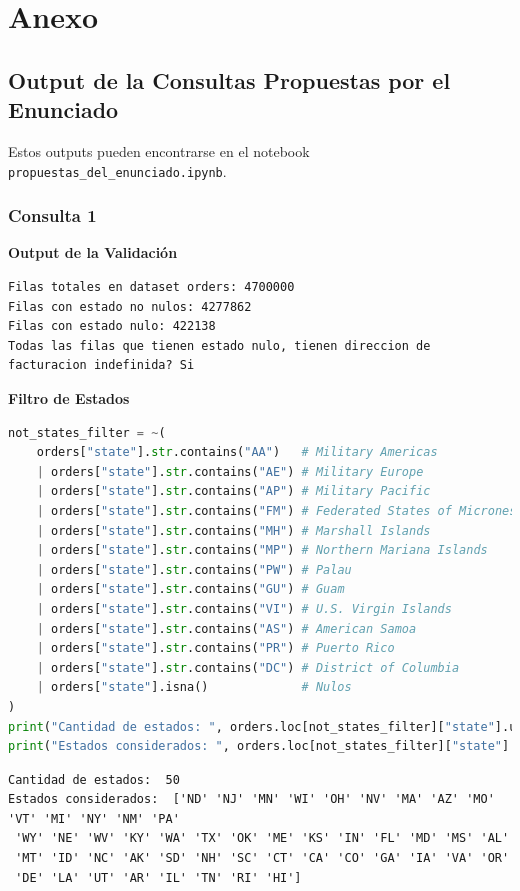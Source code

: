 \section{Anexo}
\label{anexo}
\subsection{Output de la Consultas Propuestas por el Enunciado}
Estos outputs pueden encontrarse en el notebook \texttt{propuestas\_del\_enunciado.ipynb}. 
\subsubsection{Consulta 1}
\textbf{Output de la Validación}

\label{anexo:output_validacion_consulta1}
\begin{lstlisting}[style=console]
Filas totales en dataset orders: 4700000
Filas con estado no nulos: 4277862
Filas con estado nulo: 422138
Todas las filas que tienen estado nulo, tienen direccion de facturacion indefinida? Si
\end{lstlisting}

\textbf{Filtro de Estados}

\label{anexo:output_filtro_estados}
\begin{lstlisting}[language=Python]
not_states_filter = ~(
    orders["state"].str.contains("AA")   # Military Americas
    | orders["state"].str.contains("AE") # Military Europe
    | orders["state"].str.contains("AP") # Military Pacific
    | orders["state"].str.contains("FM") # Federated States of Micronesia
    | orders["state"].str.contains("MH") # Marshall Islands
    | orders["state"].str.contains("MP") # Northern Mariana Islands
    | orders["state"].str.contains("PW") # Palau
    | orders["state"].str.contains("GU") # Guam
    | orders["state"].str.contains("VI") # U.S. Virgin Islands
    | orders["state"].str.contains("AS") # American Samoa
    | orders["state"].str.contains("PR") # Puerto Rico
    | orders["state"].str.contains("DC") # District of Columbia
    | orders["state"].isna()             # Nulos
)
print("Cantidad de estados: ", orders.loc[not_states_filter]["state"].unique().size)
print("Estados considerados: ", orders.loc[not_states_filter]["state"].unique())
\end{lstlisting}
\begin{lstlisting}[style=console, aboveskip=0pt]
Cantidad de estados:  50
Estados considerados:  ['ND' 'NJ' 'MN' 'WI' 'OH' 'NV' 'MA' 'AZ' 'MO' 'VT' 'MI' 'NY' 'NM' 'PA'
 'WY' 'NE' 'WV' 'KY' 'WA' 'TX' 'OK' 'ME' 'KS' 'IN' 'FL' 'MD' 'MS' 'AL'
 'MT' 'ID' 'NC' 'AK' 'SD' 'NH' 'SC' 'CT' 'CA' 'CO' 'GA' 'IA' 'VA' 'OR'
 'DE' 'LA' 'UT' 'AR' 'IL' 'TN' 'RI' 'HI']
\end{lstlisting}

